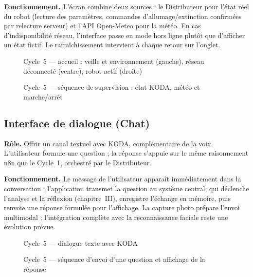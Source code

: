 \documentclass[a4paper,12pt]{report}
\begin{document}
	\textbf{Fonctionnement.} L'écran combine deux sources : le Distributeur pour
	l'état réel du robot (lecture des paramètres, commandes d'allumage/extinction
	confirmées par relecture serveur) et l'API Open-Meteo pour la météo. En cas
	d'indisponibilité réseau, l'interface passe en mode hors ligne plutôt que
	d'afficher un état fictif. Le rafraîchissement intervient à chaque retour sur
	l'onglet.
	
	\begin{figure}[H]
		\centering
		\caption{Cycle~5 --- accueil : veille et environnement (gauche), réseau
			déconnecté (centre), robot actif (droite)}
		\label{fig:ch5-ecran-home}
	\end{figure}
	
	\begin{figure}[H]
		\centering
		\caption{Cycle~5 --- séquence de supervision : état KODA, météo et marche/arrêt}
		\label{fig:ch5-seq-home}
	\end{figure}
	
	\subsection{Interface de dialogue (Chat)}
	
	\textbf{Rôle.} Offrir un canal textuel avec KODA, complémentaire de la voix.
	L'utilisateur formule une question ; la réponse s'appuie sur le même
	raisonnement n8n que le Cycle~1, orchestré par le Distributeur.
	
	\textbf{Fonctionnement.} Le message de l'utilisateur apparaît immédiatement
	dans la conversation ; l'application transmet la question au système central,
	qui déclenche l'analyse et la réflexion (chapitre~III), enregistre l'échange
	en mémoire, puis renvoie une réponse formulée pour l'affichage. La capture
	photo prépare l'envoi multimodal ; l'intégration complète avec la
	reconnaissance faciale reste une évolution prévue.
	
	\begin{figure}[H]
		\centering
		\caption{Cycle~5 --- dialogue texte avec KODA}
		\label{fig:ch5-ecran-chat}
	\end{figure}
	
	\begin{figure}[H]
		\centering
		\caption{Cycle~5 --- séquence d'envoi d'une question et affichage de la réponse}
		\label{fig:ch5-seq-chat}
	\end{figure}
	
\end{document}
